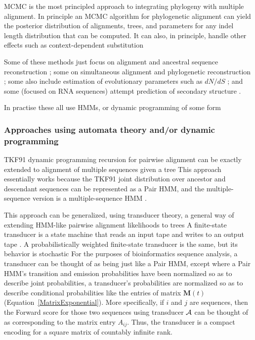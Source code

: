 \documentclass{bmcart}
\newcommand{\matr}[1]{\mathbf{#1}}
\newcommand{\trans}[1]{{\cal #1}}
\newcommand{\eqref}[1]{Equation~\ref{#1}}
\newcommand{\condmatrix}{\matr{M}}
\begin{document}
MCMC is the most principled approach to integrating phylogeny with multiple alignment.
In principle an MCMC algorithm for phylogenetic alignment can yield the posterior distribution of
alignments, trees, and parameters for any indel length distribution that can be computed.
It can also, in principle, handle other effects such as context-dependent substitution

Some of these methods just focus on alignment and ancestral sequence reconstruction \cite{HolmesBruno2001};
some on simultaneous alignment and phylogenetic reconstruction
\cite{RedelingsSuchard2005,SuchardRedelings2006,RedelingsSuchard2007,NovakEtAl2008,BouchardCoteEtAl2009,WestessonBarquistHolmes2012};
some also include estimation of evolutionary parameters such as $dN/dS$ \cite{Redelings2014};
and some (focused on RNA sequences) attempt prediction of secondary structure \cite{ArunapuramEtAl2013,MeyerMiklos2007}.

In practise these all use HMMs, or dynamic programming of some form

\subsubsection*{Approaches using automata theory and/or dynamic programming}

TKF91 dynamic programming recursion for pairwise alignment can be exactly extended to alignment of multiple sequences given a tree \cite{Hein2001,LunterSongMiklosHein2003}
This approach essentially works because the TKF91 joint distribution over ancestor and descendant sequences
can be represented as a Pair HMM,
and the multiple-sequence version is a multiple-sequence HMM \cite{HolmesBruno2001}.

This approach can be generalized, using transducer theory, a general way of extending HMM-like pairwise alignment likelihoods to trees \cite{WestessonEtAl2012,BouchardCote2013,IndelHistorian}
A finite-state transducer is a state machine that reads an input tape and writes to an output tape \cite{Mealy55}.
A probabilistically weighted finite-state transducer is the same, but its behavior is stochastic \cite{MohriPereiraRiley2000}
For the purposes of bioinformatics sequence analysis,
a transducer can be thought of as being just like a Pair HMM,
except where a Pair HMM's transition and emission probabilities
have been normalized so as to describe joint probabilities,
a transducer's probabilities are normalized so as to describe conditional probabilities
like the entries of matrix $\condmatrix(t)$ (\eqref{MatrixExponential}).
More specifically, if $i$ and $j$ are sequences, then the Forward score
for those two sequences using transducer $\trans{A}$
can be thought of as corresponding to the matrix entry $A_{ij}$.
Thus, the transducer is a compact encoding for a square matrix of countably infinite rank.
\end{document}
